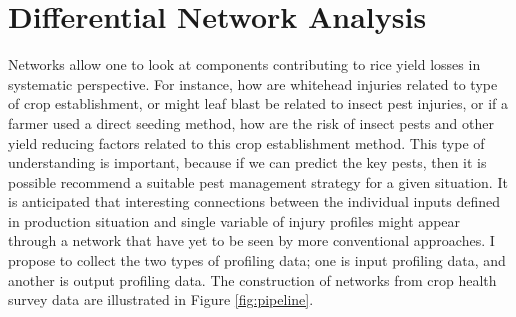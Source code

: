 
\section*{Differential Network Analysis}  %




Networks allow one to look at components contributing to rice yield losses in systematic perspective. For instance, how are whitehead injuries related to type of crop establishment, or might leaf blast be related to insect pest injuries, or if a farmer used a direct seeding method, how are the risk of insect pests and other yield reducing factors related to this crop establishment method. This type of understanding is important, because if we can predict the key pests, then it is possible recommend a suitable pest management strategy for a given situation. It is anticipated that interesting connections between the individual inputs defined in production situation and single variable of injury profiles might appear through a network that have yet to be seen by more conventional approaches. I propose to collect the two types of profiling data; one is input profiling data, and another is output profiling data.  The construction of networks from crop health survey data are illustrated in Figure \ref{fig:pipeline}.

 
